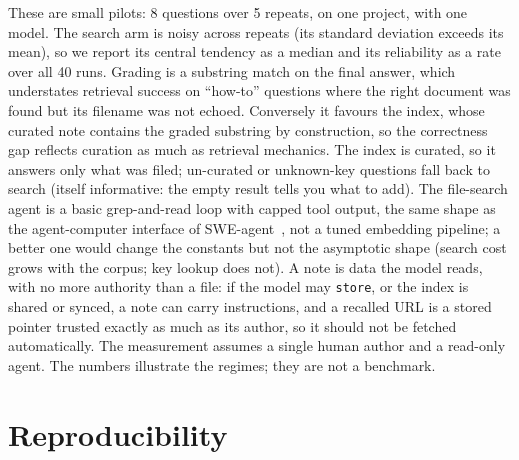 \documentclass[11pt]{article}
\newcommand{\code}[1]{\texttt{#1}}
\begin{document}
These are small pilots: 8 questions over 5 repeats, on one project, with one
model. The search arm is noisy across repeats (its standard deviation exceeds its
mean), so we report its central tendency as a median and its reliability as a rate
over all 40 runs. Grading is a substring match on
the final answer, which understates retrieval success on ``how-to'' questions
where the right document was found but its filename was not echoed. Conversely it
favours the index, whose curated note contains the graded substring by
construction, so the correctness gap reflects curation as much as retrieval
mechanics. The index is
curated, so it answers only what was filed; un-curated or unknown-key questions
fall back to search (itself informative: the empty result tells you what to add).
The file-search agent is a basic grep-and-read loop with capped tool output, the
same shape as the agent-computer interface of SWE-agent~\cite{yang2024}, not a
tuned embedding pipeline; a better one would change the constants but not the
asymptotic shape (search cost grows with the corpus; key lookup does not). A note
is data the model reads, with no more authority than a file: if the model may
\code{store}, or the index is shared or synced, a note can carry instructions,
and a recalled URL is a stored pointer trusted exactly as much as its author, so
it should not be fetched automatically. The measurement assumes a single human
author and a read-only agent. The numbers illustrate
the regimes; they are not a benchmark.

\section{Reproducibility}
\label{sec:repro}
\end{document}
